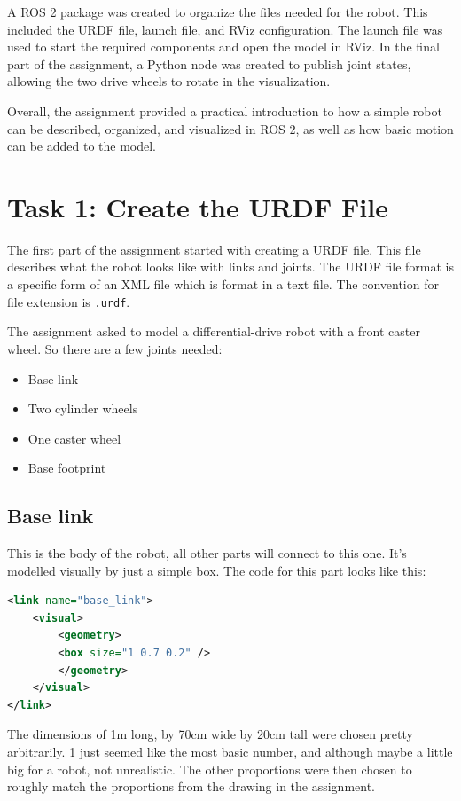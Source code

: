 \documentclass[10pt,a4paper]{article}
\begin{document}
A ROS 2 package was created to organize the files needed for the robot. This included the URDF file, launch file, and RViz configuration. The launch file was used to start the required components and open the model in RViz. In the final part of the assignment, a Python node was created to publish joint states, allowing the two drive wheels to rotate in the visualization.

Overall, the assignment provided a practical introduction to how a simple robot can be described, organized, and visualized in ROS 2, as well as how basic motion can be added to the model.


\section{Task 1: Create the URDF File}
The first part of the assignment started with creating a URDF file. This file describes what the robot looks like with links and joints. The URDF file format is a specific form of an XML file which is format in a text file. The convention for file extension is \texttt{.urdf}.

The assignment asked to model a differential-drive robot with a front caster wheel. So there are a few joints needed:

\begin{itemize}
    \item Base link
    \item Two cylinder wheels
    \item One caster wheel
    \item Base footprint
\end{itemize}

\subsection{Base link}
This is the body of the robot, all other parts will connect to this one. It's modelled visually by just a simple box. The code for this part looks like this:

\begin{lstlisting}[language=XML, basicstyle=\ttfamily\small, breaklines=true]
<link name="base_link">
	<visual>
	    <geometry>
		<box size="1 0.7 0.2" />
	    </geometry>
	</visual>
</link>
\end{lstlisting}

The dimensions of 1m long, by 70cm wide by 20cm tall were chosen pretty arbitrarily. 1 just seemed like the most basic number, and although maybe a little big for a robot, not unrealistic. The other proportions were then chosen to roughly match the proportions from the drawing in the assignment.
\end{document}
